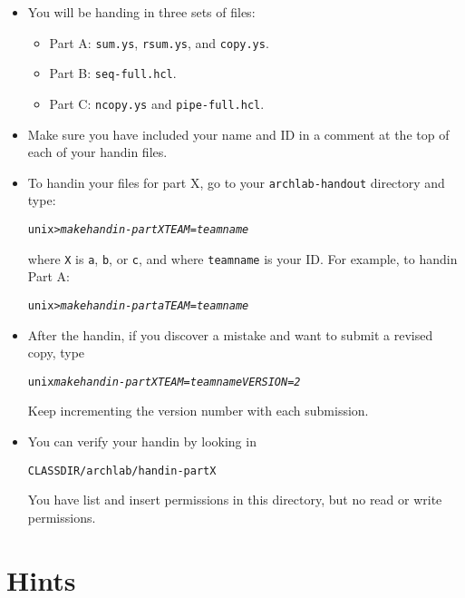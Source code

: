 \documentclass[11pt]{article}
\newenvironment{tty}%
{\small\begin{alltt}}%
{\end{alltt}}
\newenvironment{codefrag}%
{\small\begin{alltt}}%
{\end{alltt}%
}
\begin{document}
\begin{itemize}
\item You will be handing in three sets of files:
\begin{itemize}
\item Part A: \texttt{sum.ys}, \texttt{rsum.ys}, and \texttt{copy.ys}. 
\item Part B: \texttt{seq-full.hcl}.
\item Part C: \texttt{ncopy.ys} and \texttt{pipe-full.hcl}.
\end{itemize}

\item Make sure you have included your name and ID in a comment at
the top of each of your handin files.

\item To handin your files for part X, go to your \texttt{archlab-handout}
directory and type:
\begin{tty}
    unix> {\em make handin-partX TEAM=teamname}
\end{tty}
where \texttt{X} is \texttt{a}, \texttt{b}, or \texttt{c}, and where
\texttt{teamname} is your  ID. For example, to handin Part A:
\begin{tty}
    unix> {\em make handin-parta TEAM=teamname}
\end{tty}


\item After the handin, if you discover a mistake and want to
submit a revised copy, type
\begin{tty}
    unix {\em make handin-partX TEAM=teamname VERSION=2}
\end{tty}
Keep incrementing the version number with each submission.

\item You can verify your handin by looking in 
\begin{codefrag}
    CLASSDIR/archlab/handin-partX
\end{codefrag}
You have list and insert permissions in this directory, but no
read or write permissions.
\end{itemize}


\section{Hints}
\end{document}
